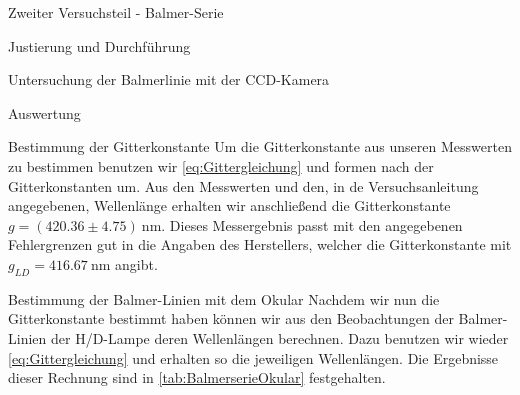 \documentclass[pdftex, a4paper,11pt, twoside, ngerman]{report}
\begin{document}
\begin{chapter}{Zweiter Versuchsteil - Balmer-Serie}
\begin{section}{Justierung und Durchführung}
\begin{subsection}{Untersuchung der Balmerlinie mit der CCD-Kamera}
      \end{subsection}

    \end{section}
   
   
   
    \begin{section}{Auswertung}
      \label{chp:Balmer:sec:Auswertung}
      
      
      
      \begin{subsection}{Bestimmung der Gitterkonstante}
        \label{chp:Balmer:sec:Auswertung:subsec:Gitterkonstante}
        Um die Gitterkonstante aus unseren Messwerten zu bestimmen benutzen 
        wir \cref{eq:Gittergleichung} und formen nach der Gitterkonstanten um.
        Aus den Messwerten und den, in de Versuchsanleitung angegebenen,
        Wellenlänge erhalten wir anschließend die Gitterkonstante
        $g=(420.36 \pm 4.75) \SI{}{\nano\meter}$. Dieses Messergebnis passt 
        mit den angegebenen Fehlergrenzen gut in die Angaben des Herstellers, 
        welcher die Gitterkonstante mit $g_{LD}=\SI{416.67}{\nano\meter}$ 
        angibt.\cite{bib:LDDidactic}
        
      \end{subsection}
      
      
      
      \begin{subsection}{Bestimmung der Balmer-Linien mit dem Okular}
        \label{chp:Balmer:sec:Auswertung:subsec:Okular}
        Nachdem wir nun die Gitterkonstante bestimmt 
        haben können wir aus den Beobachtungen der Balmer-Linien der 
        H/D-Lampe deren Wellenlängen berechnen. Dazu benutzen wir wieder 
        \cref{eq:Gittergleichung} und erhalten so die jeweiligen Wellenlängen. 
        Die Ergebnisse dieser Rechnung sind in \cref{tab:BalmerserieOkular} 
        festgehalten.
        
        

\end{subsection}
\end{section}
\end{chapter}
\end{document}
